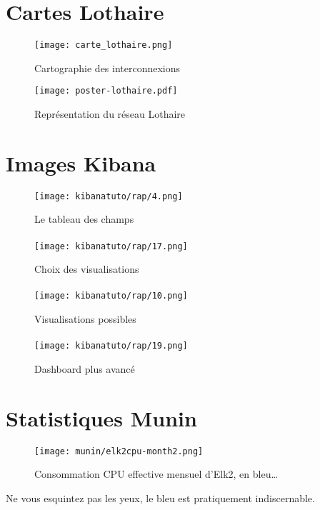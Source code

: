 \section{Cartes Lothaire}
\begin{figure}[H]
    \center
    \texttt{[image: carte\_lothaire.png]}
    \label{fig:imagereseaulothaire1}
    \caption{Cartographie des interconnexions}
\end{figure}
\begin{figure}[H]
    \center
    \texttt{[image: poster-lothaire.pdf]}
    \label{fig:imagereseaulothaire2}
    \caption{Représentation du réseau Lothaire}
\end{figure}


\section{Images Kibana}
\begin{figure}[H]
\center
\texttt{[image: kibanatuto/rap/4.png]}
\label{fig:kibanatuto4}
\caption{Le tableau des champs}
\end{figure}
\paragraph{}
\begin{figure}[H]
\center
\texttt{[image: kibanatuto/rap/17.png]}
\label{fig:kibanatuto10}
\caption{Choix des visualisations}
\end{figure}
\paragraph{}
\begin{figure}[H]
\center
\texttt{[image: kibanatuto/rap/10.png]}
\label{fig:kibanatuto7}
\caption{Visualisations possibles}
\end{figure}
\paragraph{}
\begin{figure}[H]
\center
\texttt{[image: kibanatuto/rap/19.png]}
\label{fig:kibanatuto12}
\caption{Dashboard plus avancé}
\end{figure}

\section{Statistiques Munin}
\begin{figure}[H]
\center
\texttt{[image: munin/elk2cpu-month2.png]}
\label{fig:elk2cpu}
\caption{Consommation CPU effective mensuel d'Elk2, en bleu\ldots}
\end{figure}
Ne vous esquintez pas les yeux, le bleu est pratiquement indiscernable.

